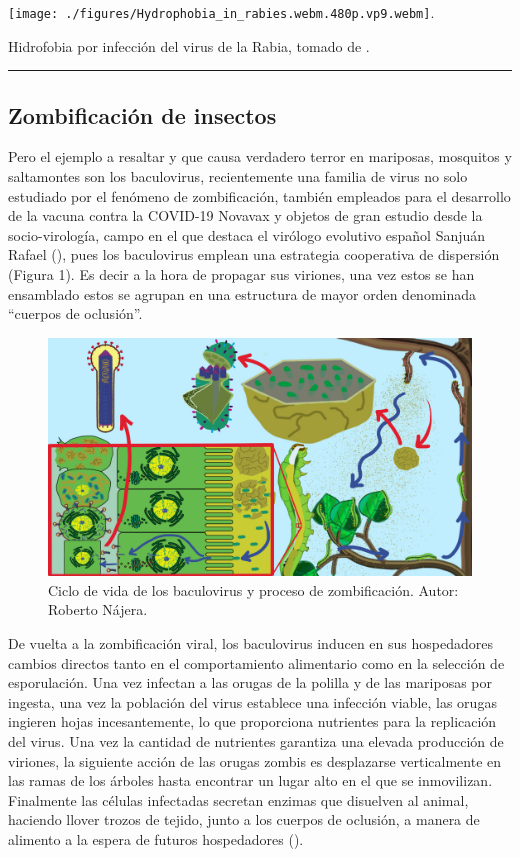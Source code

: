 \documentclass[
  12pt, krantz2,
  spanish,
]{krantz}
\begin{document}
\texttt{[image: ./figures/Hydrophobia\_in\_rabies.webm.480p.vp9.webm]}.

Hidrofobia por infección del virus de la Rabia, tomado de \citet{wertheim2009furious}.

\begin{center}\rule{0.5\linewidth}{0.5pt}\end{center}

\hypertarget{zombificaciuxf3n-de-insectos}{%
\subsection{Zombificación de insectos}\label{zombificaciuxf3n-de-insectos}}

Pero el ejemplo a resaltar y que causa verdadero terror en mariposas, mosquitos y saltamontes son los baculovirus, recientemente una familia de virus no solo estudiado por el fenómeno de zombificación, también empleados para el desarrollo de la vacuna contra la COVID-19 Novavax y objetos de gran estudio desde la socio-virología, campo en el que destaca el virólogo evolutivo español Sanjuán Rafael (\citet{sanjuan2021social}), pues los baculovirus emplean una estrategia cooperativa de dispersión (Figura 1). Es decir a la hora de propagar sus viriones, una vez estos se han ensamblado estos se agrupan en una estructura de mayor orden denominada ``cuerpos de oclusión''.

\begin{figure}
\includegraphics[width=0.8\linewidth]{figures/baculovirus_final} \caption{Ciclo de vida de los baculovirus y proceso de zombificación. Autor: Roberto Nájera.}\label{fig:zombificacion}
\end{figure}

De vuelta a la zombificación viral, los baculovirus inducen en sus hospedadores cambios directos tanto en el comportamiento alimentario como en la selección de esporulación. Una vez infectan a las orugas de la polilla y de las mariposas por ingesta, una vez la población del virus establece una infección viable, las orugas ingieren hojas incesantemente, lo que proporciona nutrientes para la replicación del virus. Una vez la cantidad de nutrientes garantiza una elevada producción de viriones, la siguiente acción de las orugas zombis es desplazarse verticalmente en las ramas de los árboles hasta encontrar un lugar alto en el que se inmovilizan. Finalmente las células infectadas secretan enzimas que disuelven al animal, haciendo llover trozos de tejido, junto a los cuerpos de oclusión, a manera de alimento a la espera de futuros hospedadores (\citet{williams2017covert}).
\end{document}
